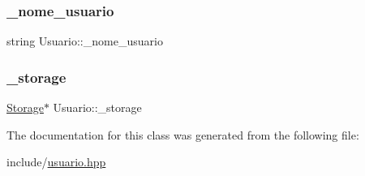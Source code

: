\subsubsection{\texorpdfstring{\+\_\+nome\+\_\+usuario}{\_nome\_usuario}}
{\footnotesize\ttfamily string Usuario\+::\+\_\+nome\+\_\+usuario\hspace{0.3cm}{\ttfamily [private]}}

\mbox{\label{classUsuario_ab513a33701fd16851c1307906913bf10}} 
\subsubsection{\texorpdfstring{\+\_\+storage}{\_storage}}
{\footnotesize\ttfamily \hyperlink{classStorage}{Storage}$\ast$ Usuario\+::\+\_\+storage\hspace{0.3cm}{\ttfamily [private]}}



The documentation for this class was generated from the following file\+:\begin{DoxyCompactItemize}
\item 
include/\hyperlink{usuario_8hpp}{usuario.\+hpp}\end{DoxyCompactItemize}
